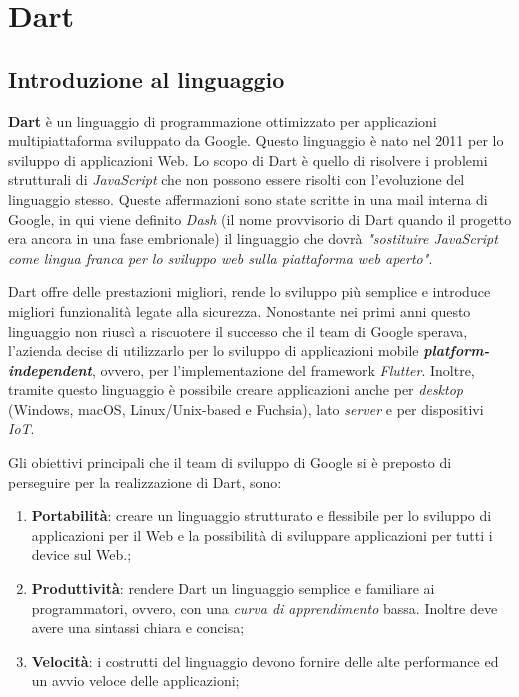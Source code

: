 \chapter{Dart}

\section{Introduzione al linguaggio}
\textbf{Dart} è un linguaggio di programmazione ottimizzato per applicazioni multipiattaforma sviluppato da Google. Questo linguaggio è nato nel 2011 per lo sviluppo di applicazioni Web. Lo scopo di Dart è quello di risolvere i problemi strutturali di \textit{JavaScript} che non possono essere risolti con l'evoluzione del linguaggio stesso. Queste affermazioni sono state scritte in una mail interna di Google, in qui viene definito \textit{Dash} (il nome provvisorio di Dart quando il progetto era ancora in una fase embrionale) il linguaggio che dovrà \textit{"sostituire JavaScript come lingua franca per lo sviluppo web sulla piattaforma web aperto"}\cite{mail_google}.

Dart offre delle prestazioni migliori, rende lo sviluppo più semplice e introduce migliori funzionalità legate alla sicurezza. Nonostante nei primi anni questo linguaggio non riuscì a riscuotere il successo che il team di Google sperava, l'azienda decise di utilizzarlo per lo sviluppo di applicazioni mobile \textbf{\textit{platform-independent}}, ovvero, per l'implementazione del framework \textit{Flutter}. Inoltre, tramite questo linguaggio è possibile creare applicazioni anche per \textit{desktop} (Windows, macOS, Linux/Unix-based e Fuchsia), lato \textit{server} e per dispositivi \textit{IoT}.

Gli obiettivi principali che il team di sviluppo di Google si è preposto di perseguire per la realizzazione di Dart, sono:
\begin{enumerate}
	\item \textbf{Portabilità}: creare un linguaggio strutturato e flessibile per lo sviluppo di applicazioni per il Web e la possibilità di sviluppare applicazioni per tutti i device sul Web.;
	\item \textbf{Produttività}: rendere Dart un linguaggio semplice e familiare ai programmatori, ovvero, con una \textit{curva di apprendimento} bassa. Inoltre deve avere una sintassi chiara e concisa;
	\item \textbf{Velocità}: i costrutti del linguaggio devono fornire delle alte performance ed un avvio veloce delle applicazioni;
\end{enumerate}

